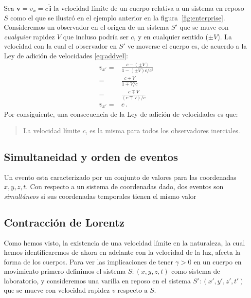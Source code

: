 Sea $\mathbf{v}=v_{x}=c\,\hat{\mathbf{i}}$ la velocidad límite de un cuerpo relativa a un sistema en reposo $S$ como el que se ilustró en el ejemplo anterior en la figura~\ref{fig:enterprise}. Consideremos un observador en el origen de un sistema $S'$ que se muve con \emph{cualquier} rapidez $V$ que incluso podría ser $c$, y en cualquier sentido ($\pm V$). La velocidad con la cual el observador en $S'$ ve moverse el cuerpo es, de acuerdo a  la Ley de adición de velocidades \eqref{eq:addvel}:
\begin{align*}
  v_{x'}=&\frac{c-(\pm V)}{1-(\pm V)c/c^2}\nonumber\\
  =&\frac{c\mp V}{1\mp V/c}\nonumber\\
  =&\frac{c\mp V}{(c\mp V)/c}\nonumber\\
  v_{x'}=&c\,.
\end{align*}
Por consiguiente, una consecuencia de la Ley de adición de velocidades es que:
\begin{quote}
  La velocidad límite $c$, es la misma para todos los observadores inerciales.
\end{quote}

\subsection{Simultaneidad y orden de eventos}

Un evento esta caracterizado por un conjunto de valores para las coordenadas $x,y,z,t$.  Con respecto a un sistema de coordenadas dado, dos eventos son \emph{simultáneos} si sus coordenadas temporales tienen el mismo valor

\subsection{Contracción de Lorentz}
Como hemos visto, la existencia de una velocidad límite en la naturaleza, la cual hemos identificaremos de ahora en adelante con la velocidad de la luz, afecta la forma de los cuerpos. Para ver las implicaciones de tener $\gamma>0$ en un cuerpo en movimiento primero definimos el sistema $S:(x,y,z,t)$ como sistema de laboratorio, y consideremos una varilla en reposo en el sistema $S':(x',y',z',t')$ que se mueve con velocidad rapidez $v$ respecto a $S$. 

